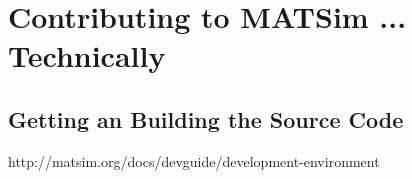 \section{Contributing to MATSim ... Technically}
\subsection{Getting an Building the Source Code}

http://matsim.org/docs/devguide/development-environment



